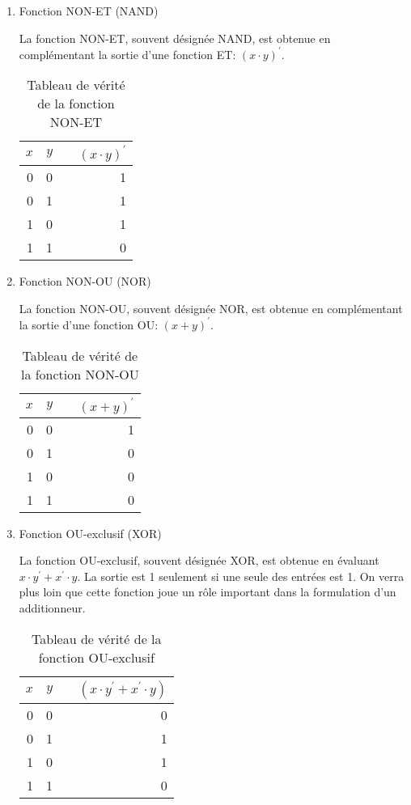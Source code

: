 \documentclass[11pt]{article}
\begin{document}
\begin{enumerate}
\item Fonction NON-ET (NAND)
\label{sec:org496a271}

La fonction NON-ET, souvent désignée NAND, est obtenue en
complémentant la sortie d'une fonction ET: \((x \cdot y)^\prime\).

\begin{table}[htbp]
\caption{\label{tab:org179bb2a}Tableau de vérité de la fonction NON-ET}
\centering
\begin{tabular}{rrlr}
\(x\) & \(y\) &  & \((x \cdot y)^\prime\)\\[0pt]
\hline
0 & 0 &  & 1\\[0pt]
0 & 1 &  & 1\\[0pt]
1 & 0 &  & 1\\[0pt]
1 & 1 &  & 0\\[0pt]
\end{tabular}
\end{table}

\item Fonction NON-OU (NOR)
\label{sec:org6a7ab7b}

La fonction NON-OU, souvent désignée NOR, est obtenue en complémentant
la sortie d'une fonction OU: \((x + y)^\prime\).

\begin{table}[htbp]
\caption{\label{tab:orgbcf5f0c}Tableau de vérité de la fonction NON-OU}
\centering
\begin{tabular}{rrlr}
\(x\) & \(y\) &  & \((x + y)^\prime\)\\[0pt]
\hline
0 & 0 &  & 1\\[0pt]
0 & 1 &  & 0\\[0pt]
1 & 0 &  & 0\\[0pt]
1 & 1 &  & 0\\[0pt]
\end{tabular}
\end{table}

\item Fonction OU-exclusif (XOR)
\label{sec:orgba29927}

La fonction OU-exclusif, souvent désignée XOR, est obtenue en évaluant
\(x \cdot y^\prime + x^\prime \cdot y\). La sortie est 1 seulement si
une seule des entrées est 1. On verra plus loin que cette fonction
joue un rôle important dans la formulation d'un additionneur.

\begin{table}[htbp]
\caption{\label{tab:org9f29cd0}Tableau de vérité de la fonction OU-exclusif}
\centering
\begin{tabular}{rrlr}
\(x\) & \(y\) &  & \((x \cdot y^\prime + x^\prime \cdot y)\)\\[0pt]
\hline
0 & 0 &  & 0\\[0pt]
0 & 1 &  & 1\\[0pt]
1 & 0 &  & 1\\[0pt]
1 & 1 &  & 0\\[0pt]
\end{tabular}
\end{table}
\end{enumerate}
\end{document}
